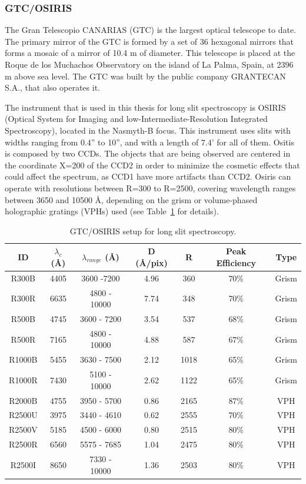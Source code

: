 \subsubsection{GTC/OSIRIS}
\label{sec2:gtc}

The Gran Telescopio CANARIAS (GTC) is the largest optical telescope to date. The primary mirror of the GTC is formed by a set of 36 hexagonal mirrors that forms a mosaic of a mirror of 10.4 m of diameter. This telescope is placed at the Roque de los Muchachos Observatory on the island of La Palma, Spain, at 2396 m above sea level. The GTC was built by the public company GRANTECAN S.A., that also operates it.

The instrument that is used in this thesis for long slit spectroscopy is OSIRIS (Optical System for Imaging and low-Intermediate-Resolution Integrated Spectroscopy), located in the Nasmyth-B focus. This instrument uses slits with widths ranging from 0.4'' to 10'', and with a length of 7.4' for all of them. Ositis is composed by two CCDs. The objects that are being observed are centered in the coordinate X=200 of the CCD2 in order to minimize the cosmetic effects that could affect the spectrum, as CCD1 have more artifacts than CCD2. Osiris can operate with resolutions between R=300 to R=2500, covering wavelength ranges between 3650 and 10500 \AA, depending on the grism or volume-phased holographic gratings (VPHs) used (see Table~\ref{tab2:osiris} for details).


\begin{table}
\begin{center}
\caption{GTC/OSIRIS setup for long slit spectroscopy.}
\begin{tabular}{|c|c|c|c|c|c|c|}
\hline
ID &  $\lambda_c$ (\AA) & $\lambda_{range}$ (\AA) & D (\AA/pix) & R & Peak Efficiency & Type \\ \hline
R300B  & 4405 & 3600 -7200 & 4.96 & 360 & 70\% & Grism  \\ \hline
R300R  & 6635 & 4800 - 10000 & 7.74 & 348 & 70\% & Grism  \\ \hline
R500B & 4745	  & 3600 - 7200 & 3.54 & 537	 & 68\%  & Grism  \\ \hline
R500R	 & 7165 & 4800 - 10000 & 4.88 & 587 & 67\% & Grism  \\ \hline
R1000B & 5455 & 3630 - 7500 & 2.12 & 1018 & 65\% & Grism  \\ \hline
R1000R & 7430 & 5100 - 10000 & 2.62 & 1122 & 65\% & Grism  \\ \hline
R2000B & 4755 & 3950 - 5700 & 0.86 & 2165 & 87\% & VPH  \\ \hline
R2500U & 3975 & 3440 - 4610 & 0.62 & 2555 & 70\% & VPH  \\ \hline
R2500V & 5185 & 4500 - 6000 & 0.80 & 2515 & 80\% & VPH  \\ \hline
R2500R & 6560 & 5575 - 7685 & 1.04 & 2475 & 80\% & VPH  \\ \hline
R2500I	 & 8650 & 7330 - 10000 & 1.36 & 2503 & 80\% & VPH  \\
\hline
\end{tabular}
\label{tab2:osiris}
\end{center}
\end{table}



